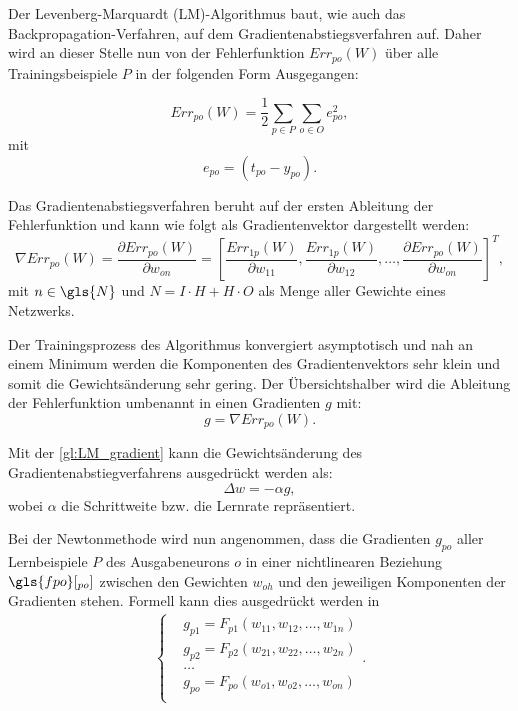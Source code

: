 Der Levenberg-Marquardt (LM)-Algorithmus baut, wie auch das Backpropagation-Verfahren, auf dem Gradientenabstiegsverfahren auf. Daher wird an dieser Stelle nun von der Fehlerfunktion $Err_{po}(W)$ über alle Trainingsbeispiele $P$ in der folgenden Form Ausgegangen:

\begin{equation}
Err_{po}(W)= \frac{1}{2} \sum\limits_{p \in P} \sum\limits_{o \in O} e_{po}^2,
\label{gl:LM_fehler}
\end{equation}
mit
\begin{equation}
e_{po}=(t_{po}-y_{po}).
\end{equation}

Das Gradientenabstiegsverfahren beruht auf der ersten Ableitung der Fehlerfunktion und kann wie folgt als Gradientenvektor dargestellt werden:
\begin{equation}
\nabla Err_{po}(W)= \frac{\partial Err_{po}(W)}{\partial w_{on}}= \left [ \frac{Err_{1p}(W)}{\partial w_{11}} , \frac{Err_{1p}(W)}{\partial w_{12}}, \dots,  \frac{\partial Err_{po}(W)}{\partial w_{on}}  \right ]^T,
\label{gl:LM_bp_err}
\end{equation}
mit $n \in \gls{N}$ und $N= I \cdot H + H \cdot O$ als Menge aller Gewichte eines Netzwerks.

Der Trainingsprozess des Algorithmus konvergiert asymptotisch und nah an einem Minimum werden die Komponenten des Gradientenvektors sehr klein und somit die Gewichtsänderung sehr gering. Der Übersichtshalber wird die Ableitung der Fehlerfunktion umbenannt in einen Gradienten $g$ mit:
\begin{equation}
g= \nabla Err_{po}(W).
\label{gl:LM_gradient}
\end{equation}

Mit der \autoref{gl:LM_gradient} kann die Gewichtsänderung des Gradientenabstiegverfahrens ausgedrückt werden als:
\begin{equation}
\Delta w= - \alpha g,
\label{gl:LM_bp_delta-w}
\end{equation}
wobei $\alpha$ die Schrittweite bzw. die Lernrate repräsentiert.

Bei der Newtonmethode wird nun angenommen, dass die Gradienten $g_{po}$ aller Lernbeispiele $P$ des Ausgabeneurons $o$ in einer nichtlinearen Beziehung $\gls{fpo}[_{po}]$ zwischen den Gewichten $w_{oh}$ und den jeweiligen Komponenten der Gradienten stehen. Formell kann dies ausgedrückt werden in
\begin{align}
\left \{
\begin{aligned}
&g_{p1}= F_{p1}(w_{11},w_{12},\dots, w_{1n})\\ 
&g_{p2}= F_{p2}(w_{21},w_{22},\dots, w_{2n})\\
&\dots\\
&g_{po}= F_{po}(w_{o1},w_{o2},\dots, w_{on})\\
\end{aligned}
.
\right.
\label{gl:LM_g1}
\end{align}

